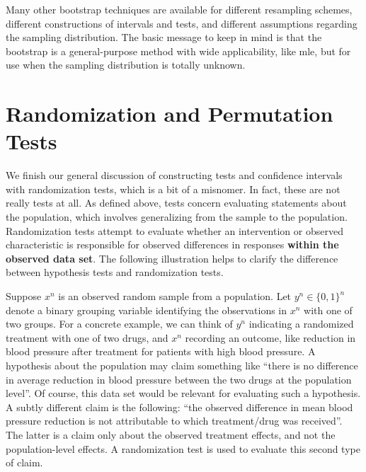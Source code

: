 \documentclass[
]{book}
\theoremstyle{definition}
\theoremstyle{definition}
\theoremstyle{definition}
\theoremstyle{definition}
\theoremstyle{remark}
\begin{document}
Many other bootstrap techniques are available for different resampling schemes, different constructions of intervals and tests, and different assumptions regarding the sampling distribution. The basic message to keep in mind is that the bootstrap is a general-purpose method with wide applicability, like mle, but for use when the sampling distribution is totally unknown.

\hypertarget{randomization-and-permutation-tests}{%
\section{Randomization and Permutation Tests}\label{randomization-and-permutation-tests}}

We finish our general discussion of constructing tests and confidence intervals with randomization tests, which is a bit of a misnomer. In fact, these are not really tests at all. As defined above, tests concern evaluating statements about the population, which involves generalizing from the sample to the population. Randomization tests attempt to evaluate whether an intervention or observed characteristic is responsible for observed differences in responses \textbf{within the observed data set}. The following illustration helps to clarify the difference between hypothesis tests and randomization tests.

Suppose \(x^n\) is an observed random sample from a population. Let \(y^n \in \{0,1\}^n\) denote a binary grouping variable identifying the observations in \(x^n\) with one of two groups. For a concrete example, we can think of \(y^n\) indicating a randomized treatment with one of two drugs, and \(x^n\) recording an outcome, like reduction in blood pressure after treatment for patients with high blood pressure. A hypothesis about the population may claim something like ``there is no difference in average reduction in blood pressure between the two drugs at the population level''. Of course, this data set would be relevant for evaluating such a hypothesis. A subtly different claim is the following: ``the observed difference in mean blood pressure reduction is not attributable to which treatment/drug was received''. The latter is a claim only about the observed treatment effects, and not the population-level effects. A randomization test is used to evaluate this second type of claim.
\end{document}

